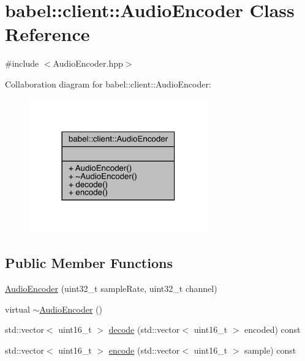 \hypertarget{classbabel_1_1client_1_1_audio_encoder}{}\section{babel\+:\+:client\+:\+:Audio\+Encoder Class Reference}
\label{classbabel_1_1client_1_1_audio_encoder}


{\ttfamily \#include $<$Audio\+Encoder.\+hpp$>$}



Collaboration diagram for babel\+:\+:client\+:\+:Audio\+Encoder\+:\nopagebreak
\begin{figure}[H]
\begin{center}
\leavevmode
\includegraphics[width=218pt]{classbabel_1_1client_1_1_audio_encoder__coll__graph}
\end{center}
\end{figure}
\subsection*{Public Member Functions}
\begin{DoxyCompactItemize}
\item 
\mbox{\hyperlink{classbabel_1_1client_1_1_audio_encoder_a88fe732b0255dd5a9387d4379863d8e6}{Audio\+Encoder}} (uint32\+\_\+t sample\+Rate, uint32\+\_\+t channel)
\item 
virtual \mbox{\hyperlink{classbabel_1_1client_1_1_audio_encoder_ac5aea5b49cc5f4f8ac7463f7d7ada87a}{$\sim$\+Audio\+Encoder}} ()
\item 
std\+::vector$<$ uint16\+\_\+t $>$ \mbox{\hyperlink{classbabel_1_1client_1_1_audio_encoder_ae0c93b9068bbb1634796abcf93b7489e}{decode}} (std\+::vector$<$ uint16\+\_\+t $>$ encoded) const
\item 
std\+::vector$<$ uint16\+\_\+t $>$ \mbox{\hyperlink{classbabel_1_1client_1_1_audio_encoder_a8bd0865794b01fac51a8c1b45dcbbad0}{encode}} (std\+::vector$<$ uint16\+\_\+t $>$ sample) const
\end{DoxyCompactItemize}


